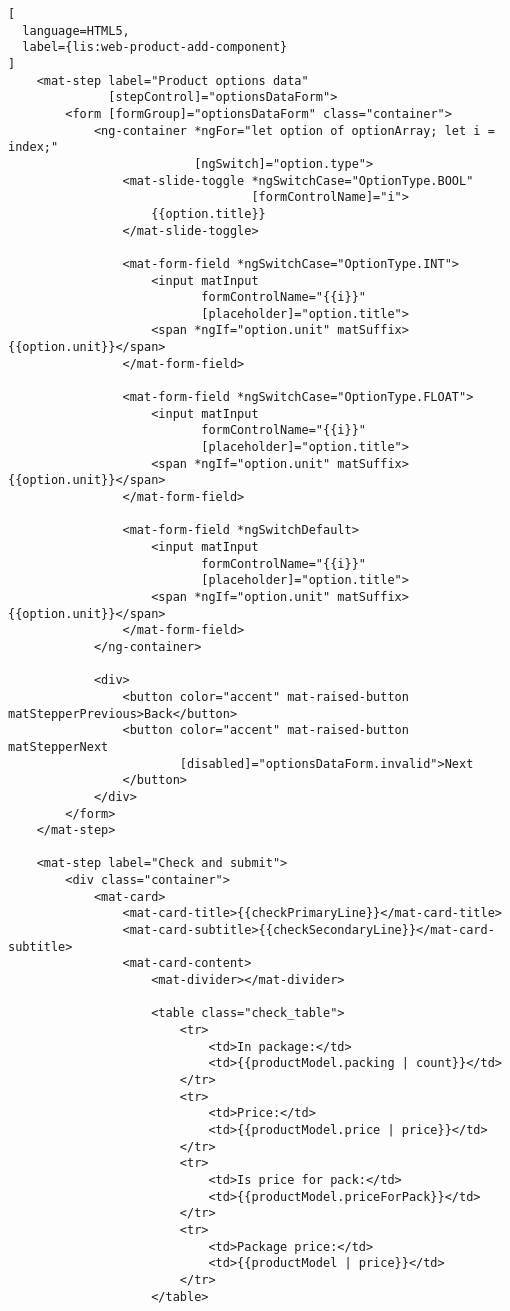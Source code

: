 \begin{lstlisting}[
  language=HTML5,
  label={lis:web-product-add-component}
]
    <mat-step label="Product options data"
              [stepControl]="optionsDataForm">
        <form [formGroup]="optionsDataForm" class="container">
            <ng-container *ngFor="let option of optionArray; let i = index;"
                          [ngSwitch]="option.type">
                <mat-slide-toggle *ngSwitchCase="OptionType.BOOL"
                                  [formControlName]="i">
                    {{option.title}}
                </mat-slide-toggle>

                <mat-form-field *ngSwitchCase="OptionType.INT">
                    <input matInput
                           formControlName="{{i}}"
                           [placeholder]="option.title">
                    <span *ngIf="option.unit" matSuffix>{{option.unit}}</span>
                </mat-form-field>

                <mat-form-field *ngSwitchCase="OptionType.FLOAT">
                    <input matInput
                           formControlName="{{i}}"
                           [placeholder]="option.title">
                    <span *ngIf="option.unit" matSuffix>{{option.unit}}</span>
                </mat-form-field>

                <mat-form-field *ngSwitchDefault>
                    <input matInput
                           formControlName="{{i}}"
                           [placeholder]="option.title">
                    <span *ngIf="option.unit" matSuffix>{{option.unit}}</span>
                </mat-form-field>
            </ng-container>

            <div>
                <button color="accent" mat-raised-button matStepperPrevious>Back</button>
                <button color="accent" mat-raised-button matStepperNext
                        [disabled]="optionsDataForm.invalid">Next
                </button>
            </div>
        </form>
    </mat-step>

    <mat-step label="Check and submit">
        <div class="container">
            <mat-card>
                <mat-card-title>{{checkPrimaryLine}}</mat-card-title>
                <mat-card-subtitle>{{checkSecondaryLine}}</mat-card-subtitle>
                <mat-card-content>
                    <mat-divider></mat-divider>

                    <table class="check_table">
                        <tr>
                            <td>In package:</td>
                            <td>{{productModel.packing | count}}</td>
                        </tr>
                        <tr>
                            <td>Price:</td>
                            <td>{{productModel.price | price}}</td>
                        </tr>
                        <tr>
                            <td>Is price for pack:</td>
                            <td>{{productModel.priceForPack}}</td>
                        </tr>
                        <tr>
                            <td>Package price:</td>
                            <td>{{productModel | price}}</td>
                        </tr>
                    </table>


\end{lstlisting}
